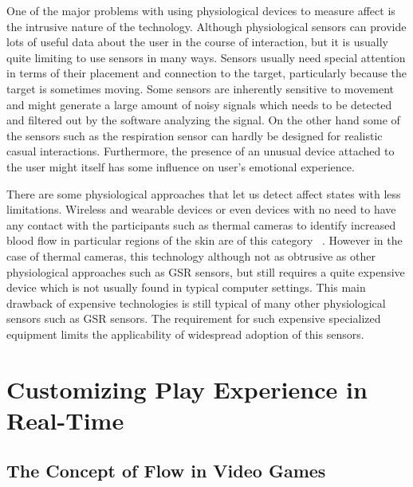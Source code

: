 \documentclass{uofsthesis-cs}
\begin{document}
One of the major problems with using physiological devices to measure affect is the intrusive nature of the technology. Although physiological sensors can provide lots of useful data about the user in the course of interaction, but  it is usually quite limiting to use sensors in many ways. Sensors usually need special attention in terms of their placement and connection to the target, particularly because the target is sometimes moving. Some sensors are inherently sensitive to movement and might generate a large amount of noisy signals which needs to be detected and filtered out by the software analyzing the signal. On the other hand some of the sensors such as the respiration sensor can hardly be designed for realistic casual interactions. Furthermore, the presence of an unusual device attached to the user might itself has some influence on user's emotional experience.

There are some physiological approaches that let us detect affect states with less limitations. Wireless and wearable devices or even devices with no need to have any contact with the participants such as thermal cameras to identify increased blood flow in particular regions of the skin are of this category ~\cite{puri2005stresscam}. However in the case of thermal cameras, this technology although not as obtrusive as other physiological approaches such as GSR sensors, but still requires a quite expensive device which is not usually found in typical computer settings. This main drawback of expensive technologies is still typical of many other physiological sensors such as GSR sensors. The requirement for such expensive specialized equipment limits the applicability of widespread adoption of this sensors. 


\chapter{Customizing Play Experience in Real-Time}
\label{chap:custmz}


\section{The Concept of Flow in Video Games}
\end{document}
